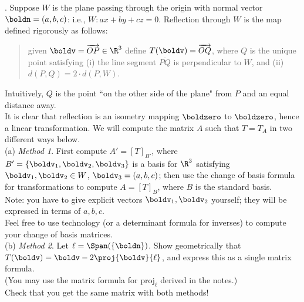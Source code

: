 . Suppose $W$ is the plane passing through the origin with normal vector $\boldn=(a,b,c)$: i.e., $W: ax+by+cz=0$. Reflection through $W$ is the map defined rigorously as follows: 
\begin{quote}
given $\boldv=\overrightarrow{OP}\in\R^3$ define $T(\boldv)=\overrightarrow{OQ}$, where $Q$ is the unique point satisfying (i) the line segment $\overline{PQ}$ is perpendicular to $W$, and (ii) $d(P,Q)=2\cdot d(P,W)$. 
\end{quote}
Intuitively, $Q$ is the point ``on the other side of the plane" from $P$ and an equal distance away. 
\\
It is clear that reflection is an isometry mapping $\boldzero$ to $\boldzero$, hence a linear transformation. We will compute the matrix $A$ such that $T=T_A$ in two different ways below.
\\
(a) {\em Method 1}. First compute $A'=[T]_{B'}$, where $B'=\{\boldv_1,\boldv_2,\boldv_3\}$ is a basis for $\R^3$ satisfying $\boldv_1, \boldv_2\in W$, $\boldv_3=(a,b,c)$; then use the change of basis formula for transformations to compute $A=[T]_B$, where $B$ is the standard basis. 
\\
Note: you have to give explicit vectors $\boldv_1, \boldv_2$ yourself; they will be expressed in terms of $a,b,c$. 
\\
Feel free to use technology (or a determinant formula for inverses) to compute your change of basis matrices. 
\\
(b) {\em Method 2}. Let $\ell=\Span(\{\boldn\})$. Show geometrically that $T(\boldv)=\boldv-2\proj{\boldv}{\ell}$, and express this as a single matrix formula.  
\\
(You may use the matrix formula for $\text{proj}_{\ell}$ derived in the notes.) 
\\
Check that you get the same matrix with both methods! 
\\
